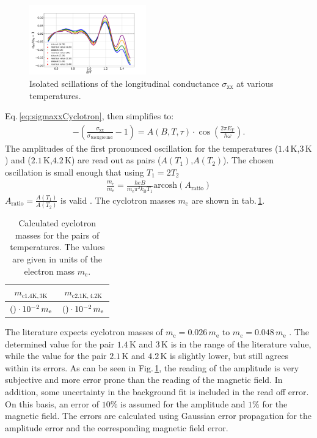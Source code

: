 \begin{figure}[h]
    \centering
    \includegraphics[width=0.45\textwidth]{../Images/reducedSigma.png}
    \caption{Isolated scillations of the longitudinal conductance $\sigma_\text{xx}$ at various temperatures.}
    \label{fig:oscillationsCyclotron}
\end{figure}
Eq.\,\ref{eq:sigmaxxCyclotron}, then simplifies to:
\begin{align}
    -(\frac{\sigma_\text{xx}}{\sigma_\text{background}}-1)= A(B,T,\tau)\cdot\cos{\left(\frac{2\pi E_\text{F}}{\hbar\omega}\right)}.
    \label{eq:onlyOscillation}
\end{align}
The amplitudes of the first pronounced oscillation for the temperatures ($1.4\,\text{K}$,$3\,\text{K}$) and ($2.1\,\text{K}$,$4.2\,\text{K}$) are read out as pairs ($A(T_1)$,$A(T_2)$).
The chosen oscillation is small enough that using $T_1 = 2T_2$ 
\begin{align}
    \frac{m_\text{c}}{m_\text{e}}=\frac{\hbar eB}{m_\text{e}\pi^2k_\text{B}T_1}\text{arcosh}\left(A_\text{ratio}\right)\label{mc/me}
\end{align}
$A_\text{ratio}=\frac{A(T_1)}{A(T_2)}$ is valid \cite{Tasksheet}.
The cyclotron masses $m_\text{c}$ are shown in tab.\,\ref{tab:cyclotronMass}.
\begin{table}[h]
    \centering
    \begin{tabular}{c|c}
        \hline\hline
        $m_{\text{c}1.4\text{K},3\text{K}}$ & $m_{\text{c}2.1\text{K},4.2\text{K}}$ \\\hline
        $(\csname cyclotron15\endcsname)\cdot 10^{-2}\,m_\text{e}$& $(\csname cyclotron21\endcsname)\cdot10^{-2}\,m_\text{e}$ \\
        \hline\hline
    \end{tabular}
    \caption{Calculated cyclotron masses for the pairs of temperatures. The values are given in units of the electron mass $m_\text{e}$. \label{tab:cyclotronMass}}
\end{table}
The literature expects cyclotron masses of $m_\text{c}= 0.026\,m_\text{e}$ to $m_\text{c}= 0.048\,m_\text{e}$ \cite{Xhang}.
The determined value for the pair $1.4\,\text{K}$ and $3\,\text{K}$ is in the range of the literature value, while the value for the pair $2.1\,\text{K}$ and $4.2\,\text{K}$ is slightly lower, but still agrees within its errors.
As can be seen in Fig.\,\ref{fig:oscillationsCyclotron}, the reading of the amplitude is very subjective and more error prone than the reading of the magnetic field.
In addition, some uncertainty in the background fit is included in the read off error.
On this basis, an error of $10\%$ is assumed for the amplitude and $1\%$ for the magnetic field.
The errors are calculated using Gaussian error propagation for the amplitude error and the corresponding magnetic field error.
